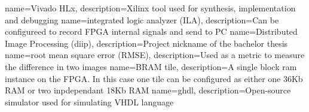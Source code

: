 %
%
{
    name=Vivado HLx,
    description={Xilinx tool used for synthesis, implementation and debugging}
}
{
    name=integrated logic analyzer (ILA),
    description={Can be configureed to record FPGA internal signals and send to PC}
}
{
    name=Distributed Image Processing (diip),
    description={Project nickname of the bachelor thesis}
}
{
    name=root mean square error (RMSE),
    description={Used as a metric to measure the difference in two images}
}
{
    name=BRAM tile,
    description={A single block ram instance on the FPGA. In this case one tile
    can be configured as either one 36Kb RAM or two inpdependant 18Kb RAM}
}
{
    name=ghdl,
    description={Open-source simulator used for simulating VHDL language}
}
